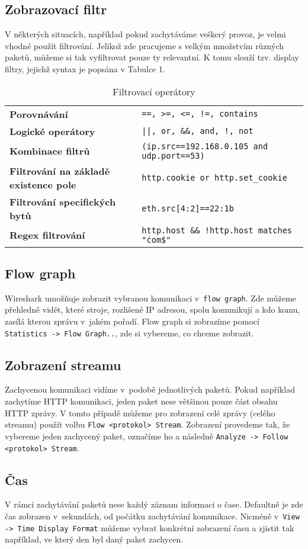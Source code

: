 \subsection{Zobrazovací filtr}
V některých situacích, například pokud zachytáváme veškerý provoz, je velmi vhodné použít filtrování. Jelikož zde pracujeme s velkým množstvím různých paketů, můžeme si tak vyfiltrovat pouze ty relevantní. K tomu slouží tzv. display filtry, jejichž syntax je popsána v Tabulce 1.
\begin{center}
\begin{table}[h]
\centering
\def\arraystretch{1.2}
\begin{tabular}{|l|l|}
\hline
\textbf{Porovnávání} & \texttt{==, >=, <=, !=, contains}\\
\textbf{Logické operátory} & \texttt{||, or, \&\&, and, !, not}\\
\textbf{Kombinace filtrů} & \texttt{(ip.src==192.168.0.105 and udp.port==53)}\\
\textbf{Filtrování na základě existence pole} & \texttt{http.cookie or http.set\_cookie}\\
\textbf{Filtrování specifických bytů} & \texttt{eth.src[4:2]==22:1b}\\
\textbf{Regex filtrování} & \texttt{http.host \&\& !http.host matches "\.com\$"}\\
\hline
\end{tabular}
\caption{Filtrovací operátory}
\end{table}
\end{center}


\subsection{Flow graph}
Wireshark umožňuje zobrazit vybranou komunikaci v~\texttt{flow graph}. Zde můžeme přehledně vidět, které stroje, rozlišené IP adresou, spolu komunikují a kdo komu, zasílá kterou zprávu v~jakém pořadí.
Flow graph si zobrazíme pomocí \texttt{Statistics -> Flow Graph..}, zde si vybereme, co chceme zobrazit.
\subsection{Zobrazení streamu}
Zachycenou komunikaci vidíme v~podobě jednotlivých paketů. Pokud například zachytíme HTTP komunikaci, jeden paket nese většinou pouze část obsahu HTTP zprávy. V tomto případě můžeme pro zobrazení celé zprávy (celého streamu) použít volbu \texttt{Flow <protokol> Stream}. Zobrazení provedeme tak, že vybereme jeden zachycený paket, označíme ho a následně \texttt{Analyze -> Follow <protokol> Stream}.
\subsection{Čas}
V rámci zachytávání paketů nese každý záznam informaci o čase. Defaultně je zde čas zobrazen v~sekundách, od počátku zachytávání komunikace. Nicméně v~\texttt{View -> Time Display Format} můžeme vybrat konkrétní zobrazení času a zjistit tak například, ve který den byl daný paket zachycen.
